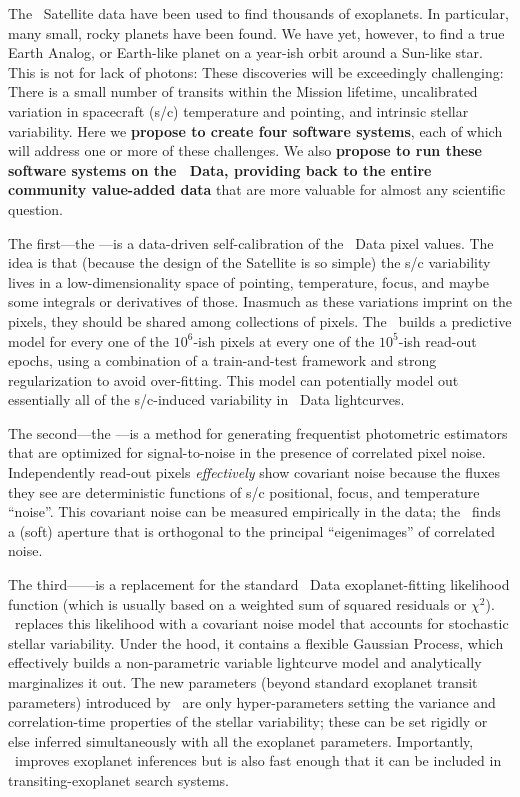 \documentclass[letterpaper,12pt]{article}
\begin{document}
The \Kepler\ Satellite data have been used to find thousands of exoplanets.
In particular, many small, rocky planets have been found.
We have yet, however, to find a true Earth Analog, or Earth-like planet on a
year-ish orbit around a Sun-like star.
This is not for lack of photons:
These discoveries will be exceedingly challenging:
There is a small number of transits within the Mission lifetime,
uncalibrated variation in spacecraft (s/c) temperature and pointing,
and intrinsic stellar variability.
Here we \textbf{propose to create four software systems}, each of which will
address one or more of these challenges.
We also \textbf{propose to run these software systems on the \Kepler\ Data,
providing back to the entire community value-added data} that are more valuable
for almost any scientific question.

The first---the \PLM---is a data-driven self-calibration of the
\Kepler\ Data pixel values.  
The idea is that (because the design of the Satellite is so simple)
the s/c variability lives in a low-dimensionality space of pointing,
temperature, focus, and maybe some integrals or derivatives of those.
Inasmuch as these variations imprint on the pixels, they should be shared among
collections of pixels.
The \PLM\ builds a predictive model for every one of the $10^6$-ish pixels at
every one of the $10^5$-ish read-out epochs, using a combination of a
train-and-test framework and strong regularization to avoid over-fitting.
This model can potentially model out essentially all of the s/c-induced
variability in \Kepler\ Data lightcurves.

The second---the \OWL---is a method for generating frequentist
photometric estimators that are optimized for signal-to-noise in the presence
of correlated pixel noise.
Independently read-out pixels \emph{effectively} show
covariant noise because the fluxes they see are deterministic functions
of s/c positional, focus, and temperature ``noise''.
This covariant noise can be measured empirically in the data; the \OWL\ finds a
(soft) aperture that is orthogonal to the principal ``eigenimages''
of correlated noise.

The third---\George---is a replacement for the standard \Kepler\ Data
exoplanet-fitting likelihood function (which is usually based on a weighted sum
of squared residuals or $\chi^2$).
\George\ replaces this likelihood with a covariant noise model that accounts for
stochastic stellar variability.
Under the hood, it contains a flexible Gaussian Process, which effectively
builds a non-parametric variable lightcurve model and analytically marginalizes
it out.
The new parameters (beyond standard exoplanet transit parameters) introduced
by \George\ are only hyper-parameters setting the variance and correlation-time
properties of the stellar variability; these can be set rigidly or else inferred
simultaneously with all the exoplanet parameters.
Importantly, \George\ improves exoplanet inferences but is also fast enough that
it can be included in transiting-exoplanet search systems.
\end{document}
